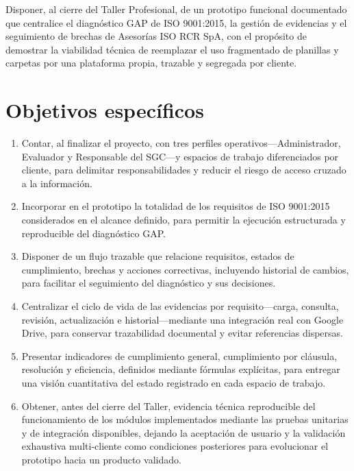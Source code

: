 \documentclass[final]{udpthesis}
\begin{document}
Disponer, al cierre del Taller Profesional, de un prototipo funcional documentado que centralice el diagnóstico GAP de ISO 9001:2015, la gestión de evidencias y el seguimiento de brechas de Asesorías ISO RCR SpA, con el propósito de demostrar la viabilidad técnica de reemplazar el uso fragmentado de planillas y carpetas por una plataforma propia, trazable y segregada por cliente.

\section{Objetivos específicos}

\begin{enumerate}
    \item Contar, al finalizar el proyecto, con tres perfiles operativos---Administrador, Evaluador y Responsable del SGC---y espacios de trabajo diferenciados por cliente, para delimitar responsabilidades y reducir el riesgo de acceso cruzado a la información.
    \item Incorporar en el prototipo la totalidad de los requisitos de ISO 9001:2015 considerados en el alcance definido, para permitir la ejecución estructurada y reproducible del diagnóstico GAP.
    \item Disponer de un flujo trazable que relacione requisitos, estados de cumplimiento, brechas y acciones correctivas, incluyendo historial de cambios, para facilitar el seguimiento del diagnóstico y sus decisiones.
    \item Centralizar el ciclo de vida de las evidencias por requisito---carga, consulta, revisión, actualización e historial---mediante una integración real con Google Drive, para conservar trazabilidad documental y evitar referencias dispersas.
    \item Presentar indicadores de cumplimiento general, cumplimiento por cláusula, resolución y eficiencia, definidos mediante fórmulas explícitas, para entregar una visión cuantitativa del estado registrado en cada espacio de trabajo.
    \item Obtener, antes del cierre del Taller, evidencia técnica reproducible del funcionamiento de los módulos implementados mediante las pruebas unitarias y de integración disponibles, dejando la aceptación de usuario y la validación exhaustiva multi-cliente como condiciones posteriores para evolucionar el prototipo hacia un producto validado.
\end{enumerate}
\end{document}
